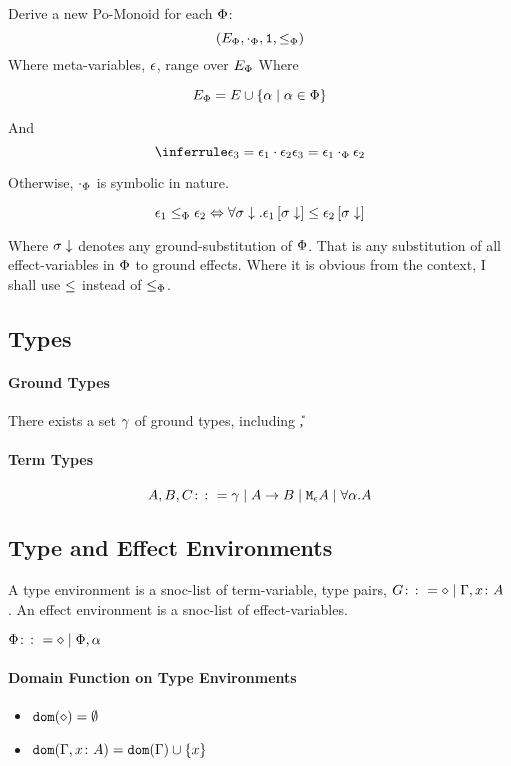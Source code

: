 \documentclass{report}
\begin{document}
Derive a new Po-Monoid for each $\P$:
\begin{equation}
    (E_\P, \dotp, \1, \subeffectp)
\end{equation}
Where meta-variables, $\e$, range over $E_\P$
Where

\begin{equation}
    E_\P = E \cup \left\{\a \mid \a \in \P \right\}
\end{equation}

And 
\begin{equation}
    \treeruleI{\e_3 = \e_1\dot\e_2}{\e_3 = \e_1\dotp\e_2}
\end{equation}

Otherwise, $\dotp$ is symbolic in nature.

\begin{equation}
    \e_1 \subeffectp \e_2 \Leftrightarrow \forall \si\downarrow. \e_1\sub{\si\downarrow} \subeffect \e_2\sub{\si\downarrow}
\end{equation}

Where $\si\downarrow$ denotes any ground-substitution of $\P$. That is any substitution of all effect-variables in $\P$ to ground effects. Where it is obvious from the context, I shall use $\subeffect$ instead of $\subeffectp$.


\subsection{Types}
    \paragraph{Ground Types}
        There exists a set $\ground$ of ground types, including \U, \B
    \paragraph{Term Types}
    $$ A, B, C \gens \ground \mid \ab \mid \mea \mid \all{\a}{A}$$
  
\subsection{Type and Effect Environments}
A type environment is a snoc-list of term-variable, type pairs, $G \gens \nil \mid \gax$ .
An effect environment is a snoc-list of effect-variables.

$\P\gens\nil\mid\P, \a$
\paragraph{Domain Function on Type Environments}
\begin{itemize}
    \item $\dom{\nil} = \emptyset$
    \item $\dom{\gax} =  \dom{\G}  \cup \left\{x \right\}$
\end{itemize}
\end{document}
